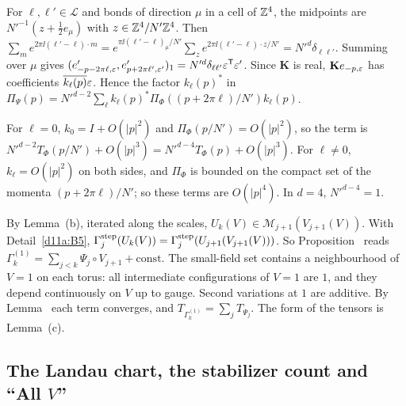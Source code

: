 \begin{detail}\label{d11a:D5}
\begin{step}[Characters]
For $\ell,\ell'\in\mathcal L$ and bonds of direction $\mu$ in a cell of $\mathbb Z^4$, the midpoints are $N'^{-1}(z+\frac12e_\mu)$ with $z\in\mathbb Z^4/N'\mathbb Z^4$. Then $\sum_me^{2\pi\ii(\ell'-\ell)\cdot m}=e^{\pi\ii(\ell'-\ell)_\mu/N'}\sum_ze^{2\pi\ii(\ell'-\ell)\cdot z/N'}=N'^d\delta_{\ell\ell'}$. Summing over $\mu$ gives $(e'_{-p-2\pi\ell,\varepsilon},e'_{p+2\pi\ell',\varepsilon'})_1=N'^d\delta_{\ell\ell'}\varepsilon^{\sf T}\varepsilon'$. Since $\mathbf K$ is real, $\mathbf Ke_{-p,\varepsilon}$ has coefficients $\overline{k_\ell(p)}\varepsilon$. Hence the factor $k_\ell(p)^*$ in $\Pi_\Psi(p)=N'^{d-2}\sum_\ell k_\ell(p)^*\Pi_\Phi((p+2\pi\ell)/N')k_\ell(p)$.
\end{step}
\begin{step}[Orders]
For $\ell=0$, $k_0=I+O(|p|^2)$ and $\Pi_\Phi(p/N')=O(|p|^2)$, so the term is $N'^{d-2}T_\Phi(p/N')+O(|p|^3)=N'^{d-4}T_\Phi(p)+O(|p|^3)$. For $\ell\ne0$, $k_\ell=O(|p|^2)$ on both sides, and $\Pi_\Phi$ is bounded on the compact set of the momenta $(p+2\pi\ell)/N'$; so these terms are $O(|p|^4)$. In $d=4$, $N'^{d-4}=1$.
\end{step}
\begin{step}
By Lemma~(b), iterated along the scales, $U_k(V)\in\mathscr M_{j+1}(V_{j+1}(V))$. With Detail~\ref{d11a:B5}, $\Gamma^{\rm step}_j(U_k(V))=\Gamma^{\rm step}_j(U_{j+1}(V_{j+1}(V)))$. So Proposition~ reads $\Gamma^{(1)}_k=\sum_{j<k}\Psi_j\circ V_{j+1}+\mathrm{const}$. The small-field set contains a neighbourhood of $V=1$ on each torus: all intermediate configurations of $V=1$ are $1$, and they depend continuously on $V$ up to gauge. Second variations at $1$ are additive. By Lemma~ each term converges, and $T_{\Gamma^{(1)}_k}=\sum_jT_{\Psi_j}$. The form of the tensors is Lemma~(c).
\end{step}
\end{detail}

\subsection{The Landau chart, the stabilizer count and ``All \texorpdfstring{$V$}{V}''}\label{d11a:chart}

